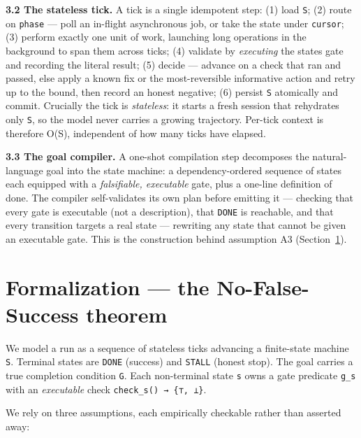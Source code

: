\textbf{3.2 The stateless tick.} A tick is a single idempotent step: (1) load \texttt{S}; (2) route on \texttt{phase} ---
poll an in-flight asynchronous job, or take the state under \texttt{cursor}; (3) perform exactly one unit of
work, launching long operations in the background to span them across ticks; (4) validate by
\emph{executing} the state\textquotesingle s gate and recording the literal result; (5) decide --- advance on a check that
ran and passed, else apply a known fix or the most-reversible informative action and retry up to the
bound, then record an honest negative; (6) persist \texttt{S} atomically and commit. Crucially the tick is
\emph{stateless}: it starts a fresh session that rehydrates only \texttt{S}, so the model never carries a growing
trajectory. Per-tick context is therefore O(\textbar S\textbar), independent of how many ticks have elapsed.

\textbf{3.3 The goal compiler.} A one-shot compilation step decomposes the natural-language goal into the
state machine: a dependency-ordered sequence of states each equipped with a \emph{falsifiable, executable}
gate, plus a one-line definition of done. The compiler self-validates its own plan before emitting it
--- checking that every gate is executable (not a description), that \texttt{DONE} is reachable, and that every
transition targets a real state --- rewriting any state that cannot be given an executable gate. This is
the construction behind assumption A3 (Section~\ref{formalization--the-no-false-success-theorem}).



\section{Formalization --- the No-False-Success theorem}\label{formalization--the-no-false-success-theorem}

We model a run as a sequence of stateless ticks advancing a finite-state machine \texttt{S}. Terminal states
are \texttt{DONE} (success) and \texttt{STALL} (honest stop). The goal carries a true completion condition \texttt{G}. Each
non-terminal state \texttt{s} owns a gate predicate \texttt{g\_s} with an \emph{executable} check \texttt{check\_s()\ →\ \{⊤,\ ⊥\}}.

We rely on three assumptions, each empirically checkable rather than asserted away:

